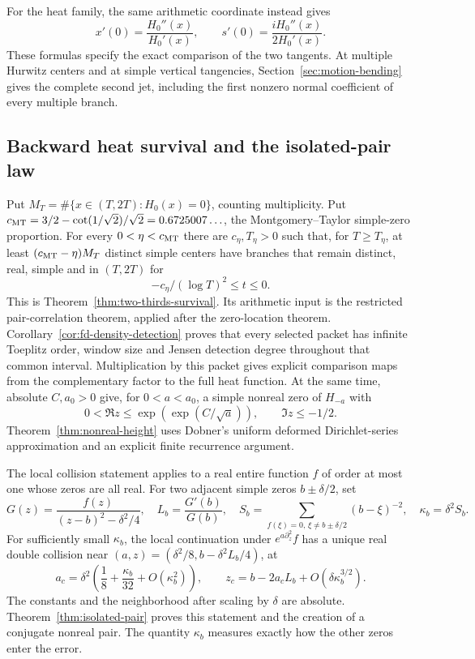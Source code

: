 For the heat family, the same arithmetic coordinate instead gives
\[
 x'(0)=\frac{H_0''(x)}{H_0'(x)},\qquad
 s'(0)=\frac{iH_0''(x)}{2H_0'(x)}.
\]
These formulas specify the exact comparison of the two tangents.
At multiple Hurwitz centers and at simple vertical tangencies,
Section~\ref{sec:motion-bending} gives the complete second jet,
including the first nonzero normal coefficient of every multiple
branch.

\subsection{Backward heat survival and the isolated-pair law}
Put $M_T=\#\{x\in(T,2T):H_0(x)=0\}$, counting multiplicity.
Put $c_{\rm MT}=3/2-\cot(1/\sqrt2)/\sqrt2=0.6725007\ldots$,
the Montgomery--Taylor simple-zero proportion.
For every $0<\eta<c_{\rm MT}$ there are $c_\eta,T_\eta>0$ such that,
for $T\ge T_\eta$, at least $(c_{\rm MT}-\eta)M_T$ distinct simple
centers have branches that remain distinct, real, simple and in
$(T,2T)$ for
\[
                    -c_\eta/(\log T)^2\le t\le0.
\]
This is Theorem~\ref{thm:two-thirds-survival}. Its arithmetic input
is the restricted pair-correlation theorem, applied after the
zero-location theorem. Corollary~\ref{cor:fd-density-detection} proves that every
selected packet has infinite Toeplitz order, window size and Jensen
detection degree throughout that common interval. Multiplication by
this packet gives explicit comparison maps from the complementary
factor to the full heat function.
At the same time, absolute $C,a_0>0$ give, for $0<a<a_0$, a simple
nonreal zero of $H_{-a}$ with
\[
 0<\Re z\le\exp(\exp(C/\sqrt a)),\qquad\Im z\le-1/2.
\]
Theorem~\ref{thm:nonreal-height} uses Dobner's uniform deformed
Dirichlet-series approximation and an explicit finite recurrence
argument.

The local collision statement applies to a real entire function $f$
of order at most one whose zeros are all real. For two adjacent
simple zeros $b\pm\delta/2$, set
\[
 G(z)=\frac{f(z)}{(z-b)^2-\delta^2/4},\quad
 L_b=\frac{G'(b)}{G(b)},\quad
 S_b=\sum_{f(\xi)=0,\,\xi\ne b\pm\delta/2}(b-\xi)^{-2},
 \quad \kappa_b=\delta^2S_b.
\]
For sufficiently small $\kappa_b$, the local continuation under
$e^{a\partial_z^2}f$ has a unique real double collision near
$(a,z)=(\delta^2/8,b-\delta^2L_b/4)$, at
\[
 a_c=\delta^2\left(\frac18+\frac{\kappa_b}{32}
                         +O(\kappa_b^2)\right),\qquad
 z_c=b-2a_cL_b+O(\delta\kappa_b^{3/2}).
\]
The constants and the neighborhood after scaling by $\delta$ are
absolute. Theorem~\ref{thm:isolated-pair} proves this statement and
the creation of a conjugate nonreal pair. The quantity $\kappa_b$
measures exactly how the other zeros enter the error.

